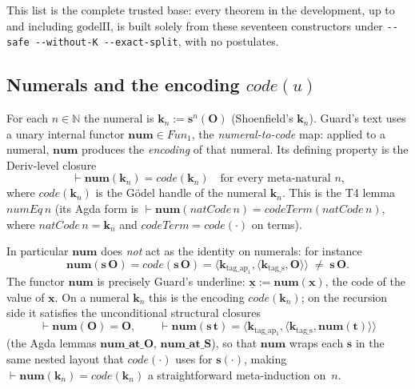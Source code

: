 \documentclass[11pt]{article}
\theoremstyle{plain}
\theoremstyle{definition}
\theoremstyle{remark}
\newcommand{\code}[1]{\mathit{code}(#1)}
\newcommand{\num}{\mathbf{num}}
\newcommand{\seq}[1]{\langle #1 \rangle}
\newcommand{\Fun}{\mathit{Fun}}
\begin{document}
This list is the complete trusted base: every theorem in the
development, up to and including $\mathrm{godelII}$, is built solely from
these seventeen constructors under \texttt{-{}-safe -{}-without-K -{}-exact-split},
with no postulates.

\subsection{Numerals and the encoding $\code{u}$}

For each $n \in \mathbb{N}$ the numeral is
$\mathbf{k}_n := \mathbf{s}^n(\mathbf{O})$ (Shoenfield's
$\mathbf{k}_n$).  Guard's text uses a unary internal functor
$\num \in \Fun_1$, the \emph{numeral-to-code} map: applied to a
numeral, $\num$ produces the \emph{encoding} of that numeral.  Its
defining property is the Deriv-level closure
\[
\vdash \num(\mathbf{k}_n) = \code{\mathbf{k}_n}
\quad\text{for every meta-natural $n$,}
\]
where $\code{\mathbf{k}_n}$ is the G\"odel handle of the numeral
$\mathbf{k}_n$.  This is the T4 lemma $\mathit{numEq}\,n$ (its Agda
form is $\vdash \num(\mathit{natCode}\,n) = \mathit{codeTerm}(\mathit{natCode}\,n)$,
where $\mathit{natCode}\,n = \mathbf{k}_n$ and
$\mathit{codeTerm} = \code{\cdot}$ on terms).

In particular $\num$ does \emph{not} act as the identity on numerals:
for instance
\[
\num(\mathbf{s}\,\mathbf{O}) = \code{\mathbf{s}\,\mathbf{O}} = \seq{\mathbf{k}_{\mathrm{tag\_ap_1}}, \seq{\mathbf{k}_{\mathrm{tag\_s}}, \mathbf{O}}} \;\neq\; \mathbf{s}\,\mathbf{O}.
\]
The functor $\num$ is precisely Guard's underline:
$\underline{\mathbf{x}} := \num(\mathbf{x})$, the code of the value of
$\mathbf{x}$.  On a numeral $\mathbf{k}_n$ this is the encoding
$\code{\mathbf{k}_n}$; on the recursion side it satisfies the
unconditional structural closures
\[
\vdash \num(\mathbf{O}) = \mathbf{O}, \qquad
\vdash \num(\mathbf{s}\,\mathbf{t}) = \seq{\mathbf{k}_{\mathrm{tag\_ap_1}}, \seq{\mathbf{k}_{\mathrm{tag\_s}}, \num(\mathbf{t})}}
\]
(the Agda lemmas $\mathbf{num\_at\_O}$, $\mathbf{num\_at\_S}$), so that
$\num$ wraps each $\mathbf{s}$ in the same nested layout that
$\code{\cdot}$ uses for $\mathbf{s}(\cdot)$, making
$\vdash \num(\mathbf{k}_n) = \code{\mathbf{k}_n}$ a straightforward
meta-induction on~$n$.
\end{document}
